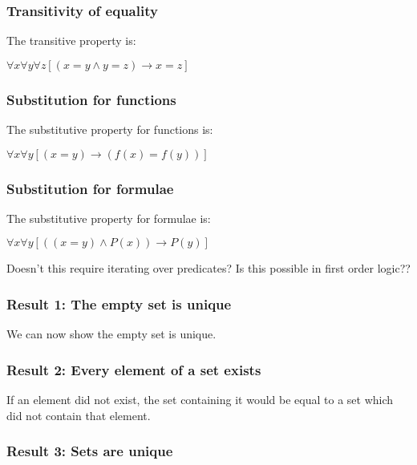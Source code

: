 \subsubsection{Transitivity of equality}

The transitive property is:

\(\forall x \forall y \forall z[(x=y \land y=z) \rightarrow x=z]\)

\subsubsection{Substitution for functions}

The substitutive property for functions is:

\(\forall x \forall y[(x=y)\rightarrow (f(x)=f(y))]\)

\subsubsection{Substitution for formulae}

The substitutive property for formulae is:

\(\forall x \forall y[((x=y)\land P(x))\rightarrow P(y)]\)

Doesn’t this require iterating over predicates? Is this possible in first order logic??

\subsubsection{Result 1: The empty set is unique}

We can now show the empty set is unique.

\subsubsection{Result 2: Every element of a set exists}

If an element did not exist, the set containing it would be equal to a set which did not contain that element.

\subsubsection{Result 3: Sets are unique}


